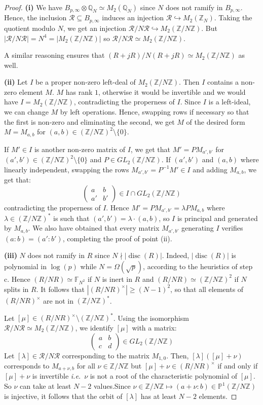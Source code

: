 \documentclass[a4paper,10pt]{report}
\theoremstyle{definition}
\theoremstyle{plain}
\theoremstyle{definition}
\newcommand{\ie}{\emph{i.e.}\ }
\newcommand{\Z}{\mathbb{Z}}
\newcommand{\Q}{\mathbb{Q}}
\newcommand{\F}{\mathbb{F}}
\newcommand{\m}[1]{\mathcal{#1}}
\renewcommand{\(}{\left(}
\renewcommand{\)}{\right)}
\renewcommand{\P}{\mathbb{P}}
\DeclareMathOperator{\disc}{disc}
\begin{document}
\begin{proof}
\textbf{(i)} We have $B_{p,\infty}\otimes\Q_N\simeq M_2(\Q_N)$ since $N$ does not ramify in $B_{p,\infty}$.  Hence, the inclusion $\m{R}\subseteq B_{p,\infty}$ induces an injection $\m{R}\hookrightarrow M_2(\Z_N)$. Taking the quotient modulo $N$, we get an injection $\m{R}/N\m{R}\hookrightarrow M_2(\Z/N\Z)$. But $|\m{R}/N\m{R}|=N^4=|M_2(\Z/N\Z)|$ so $\m{R}/N\m{R}\simeq M_2(\Z/N\Z)$.

A similar reasoning ensures that $(R+jR)/N(R+jR) \simeq M_2(\Z/N\Z)$ as well.

\textbf{(ii)} Let $I$ be a proper non-zero left-deal of $M_2(\Z/N\Z)$. Then $I$ contains a non-zero element $M$. $M$ has rank $1$, otherwise it would be invertible and we would have $I=M_2(\Z/N\Z)$, contradicting the properness of $I$. Since $I$ is a left-ideal, we can change $M$ by left operations. Hence, swapping rows if necessary so that the first is non-zero and eliminating the second, we get $M$ of the desired form $M=M_{a,b}$ for $(a,b)\in(\Z/N\Z)^2\setminus\{0\}$.

If $M'\in I$ is another non-zero matrix of $I$, we get that $M'=PM_{a',b'}$ for $(a',b')\in(\Z/N\Z)^2\setminus\{0\}$ and $P\in GL_2(\Z/N\Z)$. If $(a',b')$ and $(a,b)$ where linearly independent, swapping the rows $M_{a',b'}=P^{-1}M'\in I$ and adding $M_{a,b}$, we get that:
\[\(\begin{array}{cc}
a& b\\
a'& b'
\end{array}\)\in I\cap GL_2(\Z/N\Z)\]
contradicting the properness of $I$. Hence  $M'=PM_{a',b'}=\lambda PM_{a,b}$ where $\lambda\in(\Z/N\Z)^*$ is such that $(a',b')=\lambda\cdot(a,b)$, so $I$ is principal and generated by $M_{a,b}$. We also have obtained that every matrix $M_{a',b'}$ generating $I$ verifies $(a:b)=(a':b')$, completing the proof of point (ii).

\textbf{(iii)} $N$ does not ramify in $R$ since $N\nmid |\disc(R)|$. Indeed, $|\disc(R)|$ is polynomial in $\log(p)$ while $N=\Omega(\sqrt{p})$, according to the heuristics of step c. Hence $(R/NR)\simeq\F_{N^2}$ if $N$ is inert in $R$ and $(R/NR)\simeq(\Z/N\Z)^2$ if $N$ splits in $R$. It follows that $|(R/NR)^\times|\geq (N-1)^2$, so that all elements of $(R/NR)^\times$ are not in $(\Z/N\Z)^*$. 

Let $[\mu]\in (R/NR)^\times\setminus(\Z/N\Z)^*$.  Using the isomorphism $\m{R}/N\m{R}\simeq M_2(\Z/N\Z)$, we identify $[\mu]$ with a matrix:
\[\(\begin{array}{cc}
a & b\\
c & d
\end{array}\)\in GL_2(\Z/N\Z)\]
Let $[\lambda]\in\m{R}/N\m{R}$ corresponding to the matrix $M_{1,0}$. Then, $[\lambda]([\mu]+\nu)$ corresponds to $M_{a+\nu,b}$ for all $\nu\in\Z/N\Z$ but $[\mu]+\nu\in (R/NR)^\times$ if and only if $[\mu]+\nu$ is invertible \ie $\nu$ is not a root of the characteristic polynomial of $[\mu]$. So $\nu$ can take at least $N-2$ values.Since $\nu\in \Z/N\Z\longmapsto (a+\nu:b)\in\P^1(\Z/N\Z)$ is injective, it follows that the orbit of $[\lambda]$ has at least $N-2$ elements.
\end{proof}
\end{document}
